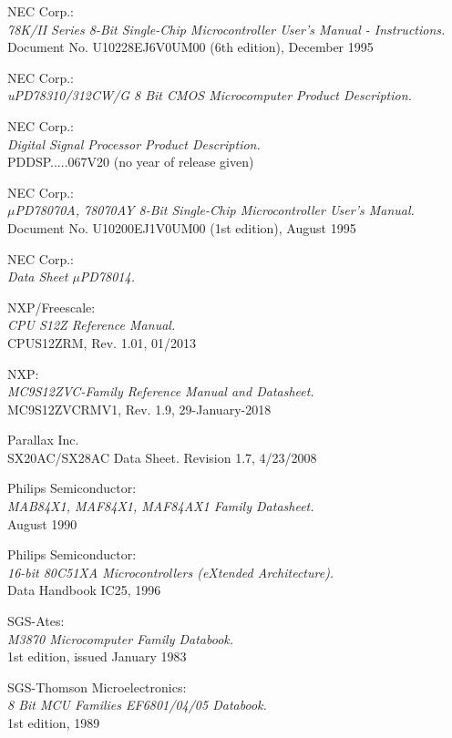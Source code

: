  NEC Corp.: \\
		{\em 78K/II Series 8-Bit Single-Chip Microcontroller
		User's Manual - Instructions.\/} \\
		Document No. U10228EJ6V0UM00 (6th edition), December 1995

 NEC Corp.: \\
{\em uPD78310/312CW/G 8 Bit CMOS Microcomputer Product
			Description.\/}

 NEC Corp.: \\
		{\em Digital Signal Processor Product Description.\/} \\
		PDDSP.....067V20 (no year of release given)

 NEC Corp.: \\
		{\em $\mu$PD78070A, 78070AY 8-Bit Single-Chip Microcontroller
		User's Manual.\/} \\
		Document No. U10200EJ1V0UM00 (1st edition), August 1995

 NEC Corp.: \\
			{\em Data Sheet $\mu$PD78014.\/}

 NXP/Freescale: \\
		{\em CPU S12Z Reference Manual.} \\
		CPUS12ZRM, Rev. 1.01, 01/2013

 NXP: \\
		{\em MC9S12ZVC-Family Reference Manual and Datasheet.} \\
		MC9S12ZVCRMV1, Rev. 1.9, 29-January-2018

 Parallax Inc. \\
		{ SX20AC/SX28AC Data Sheet.}
		Revision 1.7, 4/23/2008

 Philips Semiconductor: \\
		{\em MAB84X1, MAF84X1, MAF84AX1 Family Datasheet.} \\
		August 1990

 Philips Semiconductor: \\
		{\em 16-bit 80C51XA Microcontrollers (eXtended
		Architecture).\/} \\
		Data Handbook IC25, 1996

 SGS-Ates: \\
		{\em M3870 Microcomputer Family Databook.\/}\\
		1st edition, issued January 1983

 SGS-Thomson Microelectronics: \\
		{\em 8 Bit MCU Families EF6801/04/05 Databook.\/}\\
		1st edition, 1989

